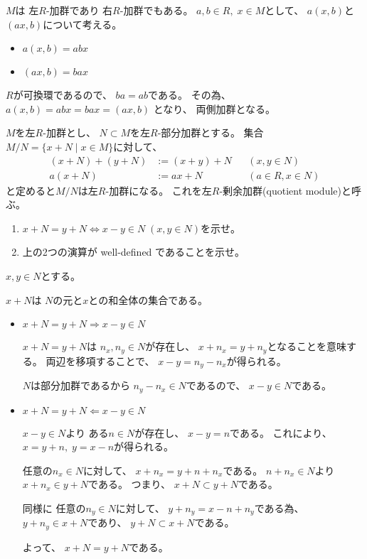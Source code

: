 \documentclass[12pt,b5paper]{ltjsarticle}
\begin{document}
$M$は
左$R$-加群であり
右$R$-加群でもある。
$a,b\in R,\;x\in M$として、
$a(x,b)$と$(ax,b)$について考える。
\begin{itemize}
 \item
      $a(x,b)=abx$
 \item
      $(ax,b)=bax$
\end{itemize}

$R$が可換環であるので、
$ba=ab$である。
その為、
$a(x,b)=abx=bax=(ax,b)$
となり、
両側加群となる。




\hrulefill

$M$を左$R$-加群とし、
$N \subset M$を左$R$-部分加群とする。
集合$M / N = \{ x+N \mid x\in M\}$に対して、
\begin{align}
 \label{eq:def_operation1}
 (x+N)+(y+N) &:= (x+y) +N && (x,y\in N)\\
 \label{eq:def_operation2}
 a(x+N) &:= ax + N && (a\in R, x\in N)
\end{align}
と定めると$M/N$は左$R$-加群になる。
これを左$R$-剰余加群(quotient module)と呼ぶ。

\begin{enumerate}
 \item $x + N = y + N \Leftrightarrow x-y \in N \; (x,y\in N)$を示せ。
 \item 上の2つの演算が well-defined であることを示せ。
\end{enumerate}

\dotfill

$x,y\in N$とする。

$x+N$は
$N$の元と$x$との和全体の集合である。

\begin{itemize}
 \item
      $x + N = y + N \Rightarrow x-y \in N$

      $x + N = y + N$は
      $n_{x}, n_{y}\in N$が存在し、
      $x+n_{x}=y+n_{y}$となることを意味する。
      両辺を移項することで、
      $x-y=n_{y}-n_{x}$が得られる。

      $N$は部分加群であるから
      $n_{y}-n_{x}\in N$であるので、
      $x-y\in N$である。

 \item
      $x + N = y + N \Leftarrow x-y \in N$

      $x-y \in N$より
      ある$n\in N$が存在し、
      $x-y=n$である。
      これにより、
      $x=y+n,\;y=x-n$が得られる。

      任意の$n_{x}\in N$に対して、
      $x+n_{x} = y+n+n_{x}$である。
      $n+n_{x} \in N$より
      $x+n_{x} \in y+N$である。
      つまり、
      $x+N \subset y+N$である。

      同様に
      任意の$n_{y}\in N$に対して、
      $y+n_{y} = x-n+n_{y}$である為、
      $y+n_{y} \in x+N$であり、
      $y+N \subset x+N$である。

      よって、
      $x+N = y+N$である。
\end{itemize}
\end{document}

